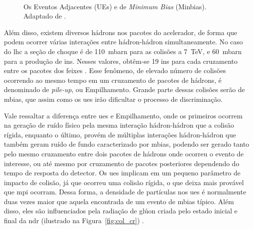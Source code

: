 \begin{figure}[ht!]
    \label{fig:minbxue}
    \begin{center}
%
        \\ 
    \end{center}
    \caption[Os Eventos Adjacentes (UEs) e de \emph{Minimum Bias} (Minbias)]{%
       Os Eventos Adjacentes (UEs) e de \emph{Minimum Bias} (Minbias). 
Adaptado de \cite{rick_field_slides}.
     }%
\end{figure}

Além disso, existem diversos hádrons nos pacotes do acelerador, de forma que podem
ocorrer várias interações entre hádron-hádron simultaneamente. No caso do \gls{lhc} 
a seção de choque é de 110~mbarn para as colisões a 7~TeV, e
60~mbarn para a produção de \glspl{in}.
Nesses valores, obtêm-se 19 \glspl{in} para cada
cruzamento entre os pacotes dos feixes \cite{webLHC,ATLAS_TDR}. Esse fenômeno, de elevado número de
colisões ocorrendo ao mesmo tempo em um cruzamento de pacotes de hádrons, é
denominado de \emph{pile-up}, ou Empilhamento. Grande parte dessas colisões 
serão de \gls{mbias}, que assim como os \glspl{ue} irão
dificultar o processo de discriminação.

Vale ressaltar a diferença entre \glspl{ue}
e Empilhamento, onde os primeiros ocorrem na geração de ruído físico
pela mesma interação hádron-hádron que a colisão rígida, enquanto o
último, provém de múltiplas interações hádron-hádron que também geram ruído de
fundo caracterizado por \gls{mbias}, podendo ser gerado tanto pelo mesmo cruzamento 
entre dois pacotes de hádrons onde ocorreu o evento de interesse, 
ou até mesmo por cruzamento de pacotes 
posteriores dependendo do tempo de resposta do detector. 
Os \glspl{ue} implicam em um pequeno parâmetro de
impacto de colisão, já que ocorreu uma colisão rígida, o que deixa mais 
provável que \gls{mpi} ocorram.
Dessa forma, a densidade de partículas nos \glspl{ue} é normalmente duas vezes
maior que aquela encontrada de um evento de \gls{mbias} típico.
Além disso, eles são influenciados pela
radiação de glúon criada pelo estado inicial e final da \gls{ndr} (ilustrado na
Figura~\ref{fig:col_cr})
\cite{Underlying}. 

